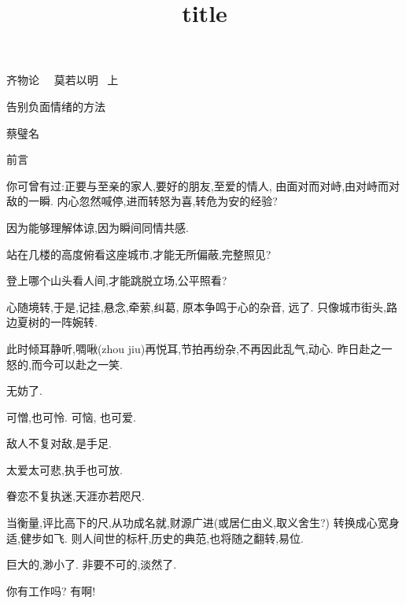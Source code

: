 \documentclass[11pt]{article}
\begin{document}
\kaishu 
	
\setcounter{section}{5}
\title{title}
\thispagestyle{empty}

\begin{center}
	{\Large \kaishu 齐物论 \ \ 莫若以明 \ 上}
	
	{\large \kaishu  告别负面情绪的方法}
	
	{\vspace{-0.2cm}}
	
	{\kaishu 蔡璧名}
\end{center}


{\Large {\color{purple} 前言}}

你可曾有过:正要与至亲的家人,要好的朋友,至爱的情人, 由面对而对峙,由对峙而对敌的一瞬. 内心忽然喊停,进而转怒为喜,转危为安的经验?

\begin{center}
	
	因为能够理解体谅,因为瞬间同情共感.
	
	站在几楼的高度俯看这座城市,才能无所偏蔽,完整照见? 
	
	登上哪个山头看人间,才能跳脱立场,公平照看?
\end{center}

心随境转,于是,记挂,悬念,牵萦,纠葛, 原本争鸣于心的杂音, 远了. 只像城市街头,路边夏树的一阵婉转. 

此时倾耳静听,啁啾(zhou jiu)再悦耳,节拍再纷杂,不再因此乱气,动心. 昨日赴之一怒的,而今可以赴之一笑.

\begin{center}
	
	无妨了.
	
	可憎,也可怜. 可恼, 也可爱.
	
	敌人不复对敌,是手足.
	
	太爱太可悲,执手也可放.
	
	眷恋不复执迷,天涯亦若咫尺.
\end{center}

当衡量,评比高下的尺,从功成名就,财源广进(或居仁由义,取义舍生?) 转换成心宽身适,健步如飞. 则人间世的标杆,历史的典范,也将随之翻转,易位.

\begin{center}
	巨大的,渺小了. 非要不可的,淡然了.
	
	你有工作吗?  有啊!
\end{center}
\end{document}
